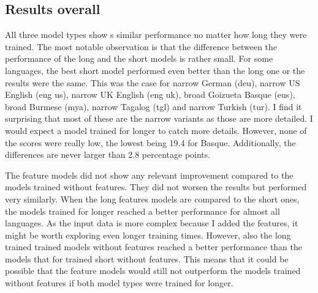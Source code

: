 \subsection{Results overall}
All three model types show s similar performance no matter how long they were trained. The most notable observation is that the difference between the performance of the long and the short models is rather small. For some languages, the best short model performed even better than the long one or the results were the same. This was the case for narrow German (deu), narrow US English (eng us), narrow UK English (eng uk), broad Goizueta Basque (eus), broad Burmese (mya), narrow Tagalog (tgl) and narrow Turkish (tur). I find it surprising that most of these are the narrow variants as those are more detailed. I would expect a model trained for longer to catch more details. However, none of the scores were really low, the lowest being 19.4 for Basque. Additionally, the differences are never larger than 2.8 percentage points.

The feature models did not show any relevant improvement compared to the models trained without features. They did not worsen the results but performed very similarly. When the long features models are compared to the short ones, the models trained for longer reached a better performance for almost all languages. As the input data is more complex because I added the features, it might be worth exploring even longer training times. However, also the long trained trained models without features reached a better performance than the models that for trained short without features. This means that it could be possible that the feature models would still not outperform the models trained without features if both model types were trained for longer. 





